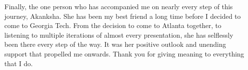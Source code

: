 Finally, the one person who has accompanied me on nearly every step of this journey, Akanksha. She has been my best friend a long time before I decided to come to Georgia Tech. From the decision to come to Atlanta together, to listening to multiple iterations of almost every presentation, she has selflessly been there every step of the way. It was her positive outlook and unending support that propelled me onwards. Thank you for giving meaning to everything that I do.

\clearpage
